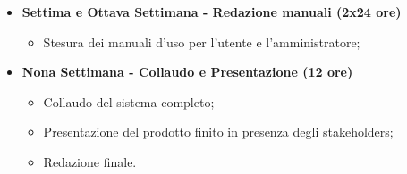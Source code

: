 {\begin{itemize}
\begin{itemize}
            \item Test e verifica dei bug e finalizzazione;
        \end{itemize}
        \item \textbf{Settima e Ottava Settimana - Redazione manuali (2x24 ore)} 
        \begin{itemize}
            \item Stesura dei manuali d'uso per l'utente e l'amministratore;
        \end{itemize}
        \item \textbf{Nona Settimana - Collaudo e Presentazione (12 ore)} 
        \begin{itemize}
            \item Collaudo del sistema completo;
            \item Presentazione del prodotto finito in presenza degli stakeholders;
            \item Redazione finale.
        \end{itemize}
    \end{itemize}
}

\newcommand{\totaleOre}{308}

\newcommand{\obiettiviObbligatori}{
	 \item \underline{\textit{O01}}: Integrazione di un sistema completo per l'apertura di serrature con lettura di codice a barre e NFC;
	 \item \underline{\textit{O02}}: Realizzazione della piattaforma web per la gestione degli accessi;
	 \item \underline{\textit{O03}}: Creazione del modello 3D dell'involucro e sua realizzazione con stampa 3D;
	 \item \underline{\textit{O04}}: Redazione della manualistica completa;
	 
}

\newcommand{\obiettiviDesiderabili}{
	 \item \underline{\textit{D01}}: Cura e definizione dell'interfaccia grafica della piattaforma web;
	 \item \underline{\textit{D02}}: Ottimizzazione del sistema esistente in termini di efficienza e prestazioni;
}

\newcommand{\obiettiviFacoltativi}{
	 \item \underline{\textit{F01}}: Creazione di un modello 3D modulare espandibile per future versioni;
}